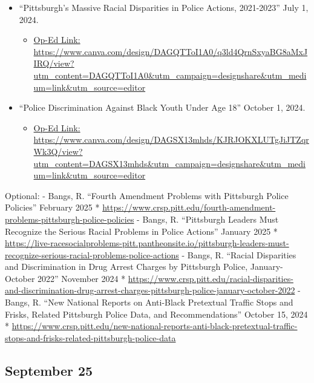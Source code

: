 \documentclass[]{tufte-handout}
\providecommand{\tightlist}{%
  \setlength{\itemsep}{0pt}\setlength{\parskip}{0pt}}
\begin{document}
\begin{itemize}
\tightlist
\item
  ``Pittsburgh's Massive Racial Disparities in Police Actions,
  2021-2023'' July 1, 2024.

  \begin{itemize}
  \tightlist
  \item
    \href{https://www.canva.com/design/DAGQTToI1A0/q3ld4QrnSxyaBG8aMxJIRQ/view?utm_content=DAGQTToI1A0\&utm_campaign=designshare\&utm_medium=link\&utm_source=editor}{Op-Ed
    Link:
    https://www.canva.com/design/DAGQTToI1A0/q3ld4QrnSxyaBG8aMxJIRQ/view?utm\_content=DAGQTToI1A0\&utm\_campaign=designshare\&utm\_medium=link\&utm\_source=editor}
  \end{itemize}
\item
  ``Police Discrimination Against Black Youth Under Age 18'' October 1,
  2024.

  \begin{itemize}
  \tightlist
  \item
    \href{https://www.canva.com/design/DAGSX13mhds/KJRJOKXLUTgJiJTZqrWk3Q/view?utm_content=DAGSX13mhds\&utm_campaign=designshare\&utm_medium=link\&utm_source=editor}{Op-Ed
    Link:
    https://www.canva.com/design/DAGSX13mhds/KJRJOKXLUTgJiJTZqrWk3Q/view?utm\_content=DAGSX13mhds\&utm\_campaign=designshare\&utm\_medium=link\&utm\_source=editor}
  \end{itemize}
\end{itemize}

Optional: - Bangs, R. ``Fourth Amendment Problems with Pittsburgh Police
Policies'' February 2025 *
\url{https://www.crsp.pitt.edu/fourth-amendment-problems-pittsburgh-police-policies}
- Bangs, R. ``Pittsburgh Leaders Must Recognize the Serious Racial
Problems in Police Actions'' January 2025 *
\url{https://live-racesocialproblems-pitt.pantheonsite.io/pittsburgh-leaders-must-recognize-serious-racial-problems-police-actions}
- Bangs, R. ``Racial Disparities and Discrimination in Drug Arrest
Charges by Pittsburgh Police, January-October 2022'' November 2024 *
\url{https://www.crsp.pitt.edu/racial-disparities-and-discrimination-drug-arrest-charges-pittsburgh-police-january-october-2022}
- Bangs, R. ``New National Reports on Anti-Black Pretextual Traffic
Stops and Frisks, Related Pittsburgh Police Data, and Recommendations''
October 15, 2024 *
\url{https://www.crsp.pitt.edu/new-national-reports-anti-black-pretextual-traffic-stops-and-frisks-related-pittsburgh-police-data}

\hypertarget{september-25}{%
\subsection{September 25}\label{september-25}}
\end{document}
